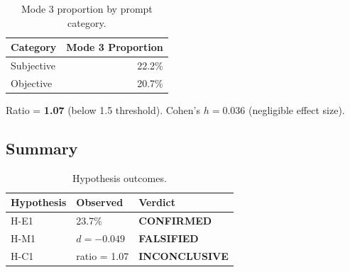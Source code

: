 \begin{table}[h]
\centering
\caption{Mode 3 proportion by prompt category.}
\label{tab:prompt_type}
\begin{tabular}{@{}lr@{}}
\toprule
Category & Mode 3 Proportion \\
\midrule
Subjective & 22.2\% \\
Objective & 20.7\% \\
\bottomrule
\end{tabular}
\end{table}

Ratio = \textbf{1.07} (below 1.5 threshold). Cohen's $h = 0.036$ (negligible effect size).

\subsection{Summary}

\begin{table}[h]
\centering
\caption{Hypothesis outcomes.}
\label{tab:hypothesis_summary}
\begin{tabular}{@{}lll@{}}
\toprule
Hypothesis & Observed & Verdict \\
\midrule
H-E1 & 23.7\% & \textbf{CONFIRMED} \\
H-M1 & $d = -0.049$ & \textbf{FALSIFIED} \\
H-C1 & ratio = 1.07 & \textbf{INCONCLUSIVE} \\
\bottomrule
\end{tabular}
\end{table}
